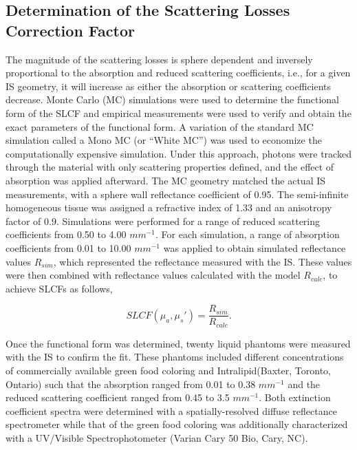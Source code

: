 \subsection{Determination of the Scattering Losses Correction Factor}
\label{sec:SLCF_methods}
The magnitude of the scattering losses is sphere dependent and inversely proportional to the absorption and reduced scattering coefficients, i.e., for a given IS geometry, it will increase as either the absorption or scattering coefficients decrease. Monte Carlo (MC) simulations were used to determine the functional form of the SLCF and empirical measurements were used to verify and obtain the exact parameters of the functional form.
A variation of the standard MC simulation called a Mono MC\cite{Kienle1996a} (or “White MC”)\cite{Alerstam2013} was used to economize the computationally expensive simulation. Under this approach, photons were tracked through the material with only scattering properties defined, and the effect of absorption was applied afterward. The MC geometry matched the actual IS measurements, with a sphere wall reflectance coefficient of 0.95. The semi-infinite homogeneous tissue was assigned a refractive index of 1.33 and an anisotropy factor of 0.9.\cite{Wang1995} Simulations were performed for a range of reduced scattering coefficients from 0.50 to 4.00 $mm^{-1}$. For each simulation, a range of absorption coefficients from 0.01 to 10.00 $mm^{-1}$ was applied to obtain simulated reflectance values $R_{sim}$, which represented the reflectance measured with the IS. These values were then combined with reflectance values calculated with the model $R_{calc}$, to achieve SLCFs as follows,

\begin{equation}
	SLCF\left(\mu_a, \mu_s'\right) = \frac{R_{sim}}{R_{calc}}.
\end{equation}

Once the functional form was determined, twenty liquid phantoms were measured with the IS to confirm the fit. These phantoms included different concentrations of commercially available green food coloring and Intralipid\textregistered (Baxter, Toronto, Ontario) such that the absorption ranged from 0.01 to 0.38 $mm^{-1}$ and the reduced scattering coefficient ranged from 0.45 to 3.5 $mm^{-1}$. Both extinction coefficient spectra were determined with a spatially-resolved diffuse reflectance spectrometer while that of the green food coloring was additionally characterized with a UV/Visible Spectrophotometer (Varian Cary 50 Bio, Cary, NC).

